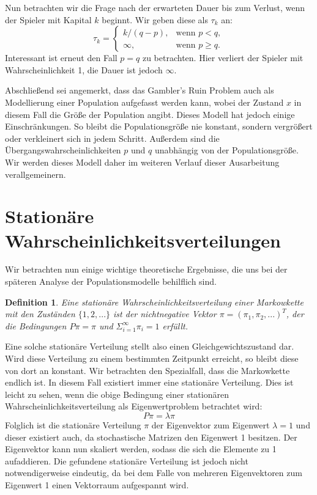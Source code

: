 \documentclass{article}
\newtheorem{defi}{Definition}
\begin{document}
Nun betrachten wir die Frage nach der erwarteten Dauer bis zum Verlust, wenn der Spieler mit Kapital $k$ beginnt. Wir geben diese als $τ_k$ an:
\[
  τ_k =
  \begin{cases}
    k/(q-p), &\text{wenn } p < q, \\
    ∞, &\text{wenn } p \geq q.
  \end{cases}
\]
Interessant ist erneut den Fall $p = q$ zu betrachten. Hier verliert der Spieler mit Wahrscheinlichkeit 1, die Dauer ist jedoch $∞$.

Abschließend sei angemerkt, dass das Gambler's Ruin Problem auch als Modellierung einer Population aufgefasst werden kann, wobei der Zustand $x$ in diesem Fall die Größe der Population angibt. Dieses Modell hat jedoch einige Einschränkungen. So bleibt die Populationsgröße nie konstant, sondern vergrößert oder verkleinert sich in jedem Schritt. Außerdem sind die Übergangswahrscheinlichkeiten $p$ und $q$ unabhängig von der Populationsgröße. Wir werden dieses Modell daher im weiteren Verlauf dieser Ausarbeitung verallgemeinern. 
\section{Stationäre Wahrscheinlichkeitsverteilungen}
Wir betrachten nun einige wichtige theoretische Ergebnisse, die uns bei der späteren Analyse der Populationsmodelle behilflich sind.
\begin{defi}
  Eine stationäre Wahrscheinlichkeitsverteilung einer Markowkette mit den Zuständen $\{1,2,...\}$ ist der nichtnegative Vektor $π = (π_1,π_2,...)^T$, der die Bedingungen $Pπ = π$ und $Σ_{i=1}^∞π_i = 1$ erfüllt.
\end{defi}
Eine solche stationäre Verteilung stellt also einen
Gleichgewichtszustand dar. Wird diese Verteilung zu einem bestimmten
Zeitpunkt erreicht, so bleibt diese von dort an konstant.
Wir betrachten den Spezialfall, dass die Markowkette endlich ist. In
diesem Fall existiert immer eine stationäre Verteilung. Dies ist
leicht zu sehen, wenn die obige Bedingung einer stationären
Wahrscheinlichkeitsverteilung als Eigenwertproblem betrachtet wird:
\[
  Pπ = λπ
\]
Folglich ist die stationäre Verteilung $π$ der Eigenvektor zum
Eigenwert $λ=1$ und dieser existiert auch, da stochastische Matrizen den
Eigenwert 1 besitzen. Der Eigenvektor kann nun skaliert werden, sodass die sich die
Elemente zu 1 aufaddieren. Die gefundene stationäre Verteilung ist
jedoch nicht notwendigerweise eindeutig, da bei dem Falle von mehreren Eigenvektoren zum Eigenwert 1 einen Vektorraum aufgespannt wird.
\end{document}
